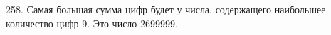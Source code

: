 258. Самая большая сумма цифр будет у числа, содержащего наибольшее количество цифр 9. Это число 2699999.\\
